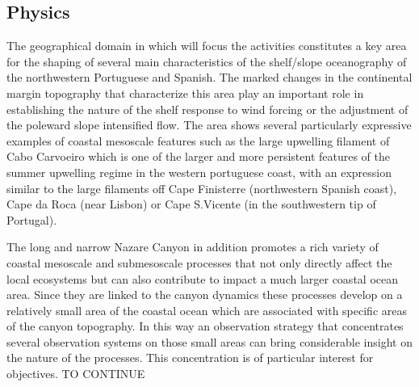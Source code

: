 \subsection{Physics}

The geographical domain in which \proj will focus the activities
constitutes a key area for the shaping of several main characteristics
of the shelf/slope oceanography of the northwestern Portuguese and
Spanish. The marked changes in the continental margin topography that
characterize this area play an important role in establishing the
nature of the shelf response to wind forcing or the adjustment of the
poleward slope intensified flow. The area shows several particularly
expressive examples of coastal mesoscale features such as the large
upwelling filament of Cabo Carvoeiro which is one of the larger and
more persistent features of the summer upwelling regime in the western
portuguese coast, with an expression similar to the large filaments
off Cape Finisterre (northwestern Spanish coast), Cape da Roca (near
Lisbon) or Cape S.Vicente (in the southwestern tip of Portugal).

The long and narrow Nazare Canyon in addition promotes a rich variety
of coastal mesoscale and submesoscale processes that not only directly
affect the local ecosystems but can also contribute to impact a much
larger coastal ocean area. Since they are linked to the canyon
dynamics these processes develop on a relatively small area of the
coastal ocean which are associated with specific areas of the canyon
topography. In this way an observation strategy that concentrates
several observation systems on those small areas can bring
considerable insight on the nature of the processes. This
concentration is of particular interest for \proj objectives. TO
CONTINUE
 
 